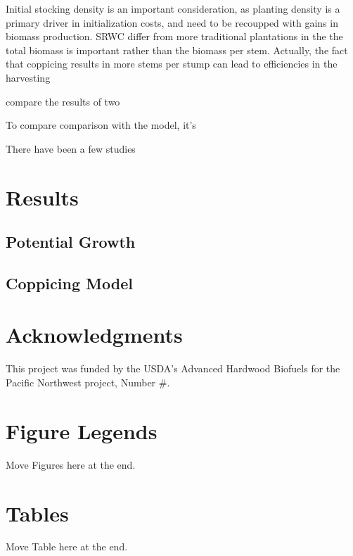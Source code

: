 \documentclass[10pt]{article}
\begin{document}
Initial stocking density is an important consideration, as planting
density is a primary driver in initialization costs, and need to be
recoupped with gains in biomass production.  \ac{SRWC} differ from
more traditional plantations in the the total biomass is important
rather than the biomass per stem.  Actually, the fact that coppicing
results in more stems per stump can lead to efficiencies in the
harvesting 

\cite{proe02} compare the results of two 

To compare comparison with the
model, it's 

There have been a few studies



\section*{Results}
\subsection*{Potential Growth}
\subsection*{Coppicing Model}


\section*{Acknowledgments}
This project was funded by the USDA's Advanced Hardwood Biofuels for
the Pacific Northwest project, Number \#.



\section*{Figure Legends}

Move Figures here at the end.

\section*{Tables}

Move Table here at the end.

\end{document}
